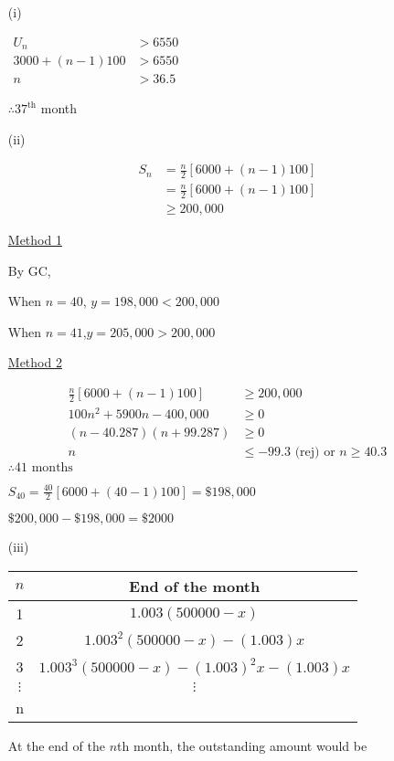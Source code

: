 \item {}
\begin{enumerate}
\item[(i)]  {}

$\begin{array}{cc}
U_{n} & >6550\\
3000+\left(n-1\right)100 & >6550\\
n & >36.5
\end{array}$

$\therefore37^{\text{th}}$ month
\item[(ii)]  {}

\begin{align*}
S_{n} & =\frac{n}{2}\left[6000+\left(n-1\right)100\right]\\
 & =\frac{n}{2}\left[6000+\left(n-1\right)100\right]\\
 & \ge200,000
\end{align*}

\uline{Method 1} 

By GC, 

When $n=40$, $y=198,000<200,000$ 

When $n=41$,$y=205,000>200,000$

\uline{Method 2} 

\begin{align*}
\frac{n}{2}\left[6000+\left(n-1\right)100\right] & \ge200,000\\
100{{n}^{2}}+5900n-400,000 & \ge0\\
\left(n-40.287\right)\left(n+99.287\right) & \ge0\\
n & \le-99.3\text{ (rej) or }n\ge40.3
\end{align*}
 $\therefore41\text{ months}$

$S_{40}=\frac{40}{2}\left[6000+\left(40-1\right)100\right]=\$198,000$

$\$200,000-\$198,000=\$2000$
\item[(iii)]  {}

\begin{tabular}{|c|c|}
\hline 
$n$ & End of the month\tabularnewline
\hline 
\hline 
1 & $1.003\left(500000-x\right)$\tabularnewline
\hline 
2 & $1.003^{2}\left(500000-x\right)-\left(1.003\right)x$\tabularnewline
\hline 
3 & $1.003^{3}\left(500000-x\right)-\left(1.003\right)^{2}x-\left(1.003\right)x$\tabularnewline
\hline 
$\vdots$ & $\vdots$\tabularnewline
\hline 
n & \tabularnewline
\hline 
\end{tabular}

At the end of the $n$th month, the outstanding amount would be 


\end{enumerate}
